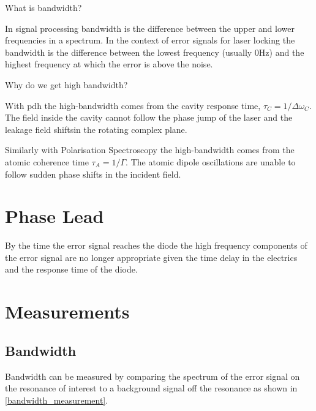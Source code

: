 \documentclass{article}
\begin{document}
\begin{multicols}{2}
What is bandwidth?

In signal processing bandwidth is the difference between the upper and lower frequencies in a spectrum. In the context of error signals for laser locking the bandwidth is the difference between the lowest frequency (usually 0Hz) and the highest frequency at which the error is above the noise.

Why do we get high bandwidth?

With \gls{pdh} the high-bandwidth comes from the cavity response time, $\tau_C= 1/\Delta\omega_C$. The field inside the cavity cannot follow the phase jump of the laser and the leakage field shiftsin the rotating complex plane.

Similarly with Polarisation Spectroscopy the high-bandwidth comes from the atomic coherence time $\tau_A = 1/\Gamma$. The atomic dipole oscillations are unable to follow sudden phase shifts in the incident field.

\section{Phase Lead}

By the time the error signal reaches the diode the high frequency components of the error signal are no longer appropriate given the time delay in the electrics and the response time of the diode.

\section{Measurements}



\subsection{Bandwidth}

Bandwidth can be measured by comparing the spectrum of the error signal on the resonance of interest to a background signal off the resonance as shown in \ref{bandwidth_measurement}.


\end{multicols}
\end{document}
